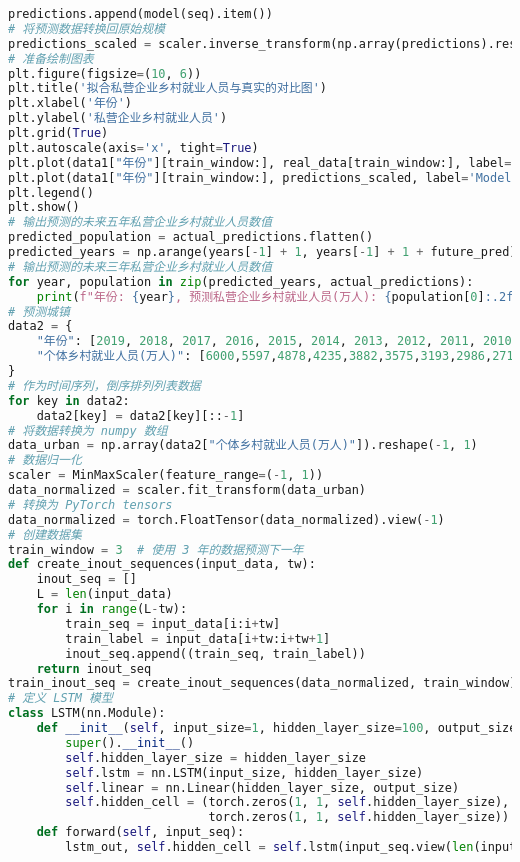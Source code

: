 \begin{lstlisting}[language=python,caption={就业前景}]
        predictions.append(model(seq).item())
# 将预测数据转换回原始规模
predictions_scaled = scaler.inverse_transform(np.array(predictions).reshape(-1, 1))
# 准备绘制图表
plt.figure(figsize=(10, 6))
plt.title('拟合私营企业乡村就业人员与真实的对比图')
plt.xlabel('年份')
plt.ylabel('私营企业乡村就业人员')
plt.grid(True)
plt.autoscale(axis='x', tight=True)
plt.plot(data1["年份"][train_window:], real_data[train_window:], label='Real Data')
plt.plot(data1["年份"][train_window:], predictions_scaled, label='Model Fit', linestyle='--')
plt.legend()
plt.show()
# 输出预测的未来五年私营企业乡村就业人员数值
predicted_population = actual_predictions.flatten()
predicted_years = np.arange(years[-1] + 1, years[-1] + 1 + future_pred)
# 输出预测的未来三年私营企业乡村就业人员数值
for year, population in zip(predicted_years, actual_predictions):
    print(f"年份: {year}, 预测私营企业乡村就业人员(万人): {population[0]:.2f}")
# 预测城镇
data2 = {
    "年份": [2019, 2018, 2017, 2016, 2015, 2014, 2013, 2012, 2011, 2010, 2009, 2008, 2007, 2006, 2005, 2004, 2003, 2002, 2001, 2000, 1999, 1998, 1997, 1996, 1995, 1994, 1993, 1992, 1991, 1990],
    "个体乡村就业人员(万人)": [6000,5597,4878,4235,3882,3575,3193,2986,2718,2540,2341,2167,2187,2147,2123,2066,2260,2474,2629,2934,3827,3855,3522,3308,3054,2551,2010,1728,1616,1491],
}
# 作为时间序列，倒序排列列表数据
for key in data2:
    data2[key] = data2[key][::-1]
# 将数据转换为 numpy 数组
data_urban = np.array(data2["个体乡村就业人员(万人)"]).reshape(-1, 1)
# 数据归一化
scaler = MinMaxScaler(feature_range=(-1, 1))
data_normalized = scaler.fit_transform(data_urban)
# 转换为 PyTorch tensors
data_normalized = torch.FloatTensor(data_normalized).view(-1)
# 创建数据集
train_window = 3  # 使用 3 年的数据预测下一年
def create_inout_sequences(input_data, tw):
    inout_seq = []
    L = len(input_data)
    for i in range(L-tw):
        train_seq = input_data[i:i+tw]
        train_label = input_data[i+tw:i+tw+1]
        inout_seq.append((train_seq, train_label))
    return inout_seq
train_inout_seq = create_inout_sequences(data_normalized, train_window)
# 定义 LSTM 模型
class LSTM(nn.Module):
    def __init__(self, input_size=1, hidden_layer_size=100, output_size=1):
        super().__init__()
        self.hidden_layer_size = hidden_layer_size
        self.lstm = nn.LSTM(input_size, hidden_layer_size)
        self.linear = nn.Linear(hidden_layer_size, output_size)
        self.hidden_cell = (torch.zeros(1, 1, self.hidden_layer_size),
                            torch.zeros(1, 1, self.hidden_layer_size))
    def forward(self, input_seq):
        lstm_out, self.hidden_cell = self.lstm(input_seq.view(len(input_seq), 1, -1), self.hidden_cell)

\end{lstlisting}
